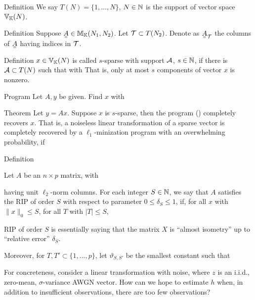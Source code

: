 \Result
{Definition}
{
We say \(T (N) =\{1, \dotsc, N\}\), \(N \in \mathbb{N}\) is the support of vector space \(\mathbb{V}_{\mathbb{K}} (N)\).
}

\Result
{Definition}
{
Suppose \(\M{A} \in \MB{M}_{\MB{K}} (N_1, N_2)\).
Let \(\mathcal{T} \subset T (N_2)\).
Denote as \(\M{A}_{\MC{T}}\) the columns of \(\M{A}\) having indices in \(\mathcal{T}\).
}

\Result
{Definition}
{
\(x \in \mathbb{V}_{\mathbb{K}} (N)\) is called \(s\)-sparse with support \(\mathcal{A}\), \(s \in \mathbb{N}\), if there is \(\mathcal{A} \subset T (N)\) such that
%
with
%
That is, only at most \(s\) components of vector \(x\) is nonzero.
}

\Result
{Program}
{
Let \(A,y\) be given.
Find \(x\) with
%
%
}

\Result
{Theorem}
{
Let \(y =Ax\).
Suppose \(x\) is \(s\)-sparse, then the program () completely recovers \(x\).
That is, a noiseless linear transformation of a sparse vector is completely recovered by a \(\ell_1\)-minization program with an overwhelming probability, if
%
%
}



\Result
{Definition}
{
Let \(A\) be an \(n \times p\) matrix, with
%
%

having unit \(\ell_2\)-norm columns.
For each integer \(S \in \mathbb{N}\), we say that \(A\) satisfies the RIP of order \(S\) with respect to parameter \(0 \leq \delta_S \leq 1\), if, for all \(x\) with \(\|x\|_0 \leq S\), for all \(T\) with \(|T| \leq S\),
%
%
}

RIP of order \(S\) is essentially saying that the matrix \(X\) is ``almost isometry'' up to ``relative error'' \(\delta_S\).

Moreover, for \(T,T' \subset \{1, \dotsc, p \}\), let \(\vartheta_{S,S'}\) be the smallest constant such that
%
%



For concreteness, consider a linear transformation with noise,
%
%
where \(z\) is an i.i.d., zero-mean, \(\sigma\)-variance AWGN vector.
How can we hope to estimate \(h\) when, in addition to insufficient observations, there are too few observations?

